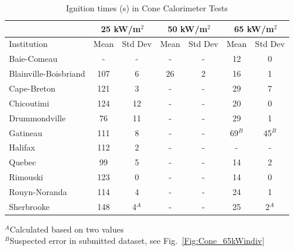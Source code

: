 \documentclass{book}
\begin{document}
\begin{table}[ht]
\caption{Ignition times (s) in Cone Calorimeter Tests}
\label{Table_12}
\begin{center}
\begin{tabular}{|l|cc|cc|cc|}
\hline
                         & \multicolumn{2}{|c|}{25 kW/m$^2$} &  \multicolumn{2}{|c|}{50 kW/m$^2$} & \multicolumn{2}{|c|}{65 kW/m$^2$}    \\ \hline
Institution              & Mean     & Std Dev                & Mean      & Std Dev                & Mean     & Std Dev                   \\ \hline
Baie-Comeau              & -        & -                      & -         & -                      & 12       & 0                         \\
Blainville-Boisbriand    & 107      & 6                      & 26        & 2                      & 16       & 1                         \\
Cape-Breton              & 121      & 3                      & -         & -                      & 29       & 7                         \\
Chicoutimi               & 124      & 12                     & -         & -                      & 20       & 0                         \\
Drummondville            & 76       & 11                     & -         & -                      & 29       & 1                         \\
Gatineau                 & 111      & 8                      & -         & -                      & 69$^B$   & 45$^B$                    \\
Halifax                  & 112      & 2                      & -         & -                      & -        & -                         \\
Quebec                   & 99       & 5                      & -         & -                      & 14       & 2                         \\
Rimouski                 & 123      & 0                      & -         & -                      & 14       & 0                         \\
Rouyn-Noranda            & 114      & 4                      & -         & -                      & 24       & 1                         \\
Sherbrooke               & 148      & 4$^A$                  & -         & -                      & 25       & 2$^A$                     \\ \hline
\end{tabular}
\end{center}
$^A$Calculated based on two values     \\
$^B$Suspected error in submitted dataset, see Fig.~\ref{Fig:Cone_65kWindiv}
\end{table}
\end{document}
